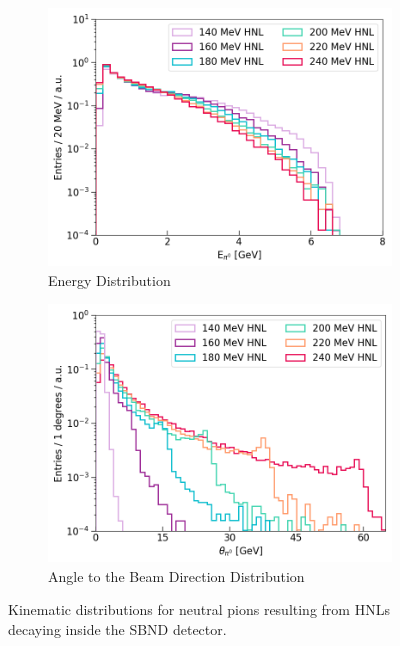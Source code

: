 \begin{figure}[tbp!]
        \centering
        \begin{subfigure}[b]{0.495\textwidth}
            \centering
            \includegraphics[width=\textwidth]{pi0_energy}
            \caption{Energy Distribution}%
        \end{subfigure}
        \hfill
        \begin{subfigure}[b]{0.495\textwidth}  
            \centering 
            \includegraphics[width=\textwidth]{pi0_angle2Beam}
            \caption{Angle to the Beam Direction Distribution}%
        \end{subfigure}
        \caption[pi0_distribution]{Kinematic distributions for neutral pions resulting from HNLs decaying inside the SBND detector.}
        \label{fig:pi0_distribution}
\end{figure}
